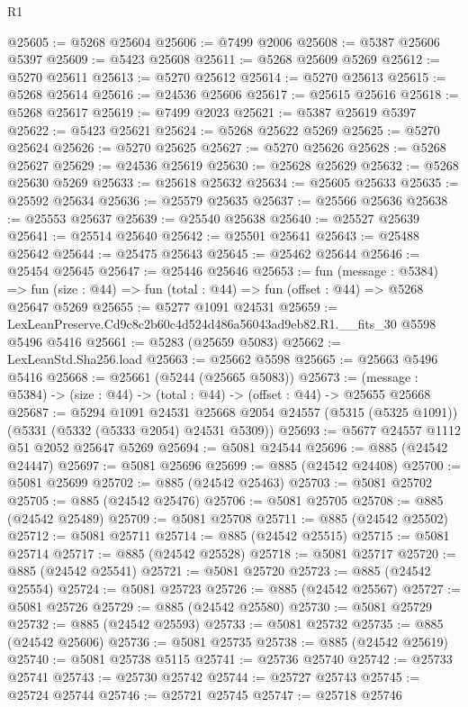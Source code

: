 \begin{lexlean}{R1}
\begin{coremodule}
@25605 := @5268 @25604
@25606 := @7499 @2006
@25608 := @5387 @25606 @5397
@25609 := @5423 @25608
@25611 := @5268 @25609 @5269
@25612 := @5270 @25611
@25613 := @5270 @25612
@25614 := @5270 @25613
@25615 := @5268 @25614
@25616 := @24536 @25606
@25617 := @25615 @25616
@25618 := @5268 @25617
@25619 := @7499 @2023
@25621 := @5387 @25619 @5397
@25622 := @5423 @25621
@25624 := @5268 @25622 @5269
@25625 := @5270 @25624
@25626 := @5270 @25625
@25627 := @5270 @25626
@25628 := @5268 @25627
@25629 := @24536 @25619
@25630 := @25628 @25629
@25632 := @5268 @25630 @5269
@25633 := @25618 @25632
@25634 := @25605 @25633
@25635 := @25592 @25634
@25636 := @25579 @25635
@25637 := @25566 @25636
@25638 := @25553 @25637
@25639 := @25540 @25638
@25640 := @25527 @25639
@25641 := @25514 @25640
@25642 := @25501 @25641
@25643 := @25488 @25642
@25644 := @25475 @25643
@25645 := @25462 @25644
@25646 := @25454 @25645
@25647 := @25446 @25646
@25653 := fun (message : @5384) =>
  fun (size : @44) => fun (total : @44) => fun (offset : @44) => @5268 @25647 @5269
@25655 := @5277 @1091 @24531
@25659 := LexLeanPreserve.Cd9c8c2b60c4d524d486a56043ad9eb82.R1.__fits_30 @5598 @5496 @5416
@25661 := @5283 (@25659 @5083)
@25662 := LexLeanStd.Sha256.load
@25663 := @25662 @5598
@25665 := @25663 @5496 @5416
@25668 := @25661 (@5244 (@25665 @5083))
@25673 := (message : @5384) -> (size : @44) -> (total : @44) -> (offset : @44) -> @25655 @25668
@25687 := @5294
    @1091
    @24531
    @25668
    @2054
    @24557
    (@5315 (@5325 @1091))
    (@5331 (@5332 (@5333 @2054) @24531 @5309))
@25693 := @5677 @24557 @1112 @51 @2052 @25647 @5269
@25694 := @5081 @24544
@25696 := @885 (@24542 @24447)
@25697 := @5081 @25696
@25699 := @885 (@24542 @24408)
@25700 := @5081 @25699
@25702 := @885 (@24542 @25463)
@25703 := @5081 @25702
@25705 := @885 (@24542 @25476)
@25706 := @5081 @25705
@25708 := @885 (@24542 @25489)
@25709 := @5081 @25708
@25711 := @885 (@24542 @25502)
@25712 := @5081 @25711
@25714 := @885 (@24542 @25515)
@25715 := @5081 @25714
@25717 := @885 (@24542 @25528)
@25718 := @5081 @25717
@25720 := @885 (@24542 @25541)
@25721 := @5081 @25720
@25723 := @885 (@24542 @25554)
@25724 := @5081 @25723
@25726 := @885 (@24542 @25567)
@25727 := @5081 @25726
@25729 := @885 (@24542 @25580)
@25730 := @5081 @25729
@25732 := @885 (@24542 @25593)
@25733 := @5081 @25732
@25735 := @885 (@24542 @25606)
@25736 := @5081 @25735
@25738 := @885 (@24542 @25619)
@25740 := @5081 @25738 @5115
@25741 := @25736 @25740
@25742 := @25733 @25741
@25743 := @25730 @25742
@25744 := @25727 @25743
@25745 := @25724 @25744
@25746 := @25721 @25745
@25747 := @25718 @25746

\end{coremodule}
\end{lexlean}
